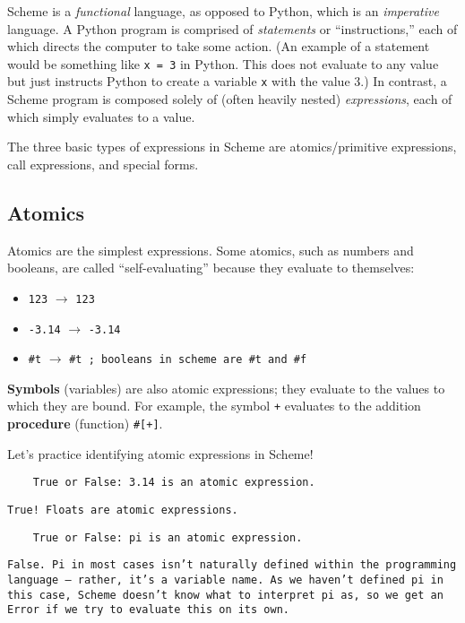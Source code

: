 Scheme is a \textit{functional} language, as opposed to Python, which is an \textit{imperative} language. A Python program is comprised of \textit{statements} or ``instructions,'' each of which directs the computer to take some action. (An example of a statement would be something like \lstinline{x = 3} in Python. This does not evaluate to any value but just instructs Python to create a variable \lstinline{x} with the value 3.) In contrast, a Scheme program is composed solely of (often heavily nested) \textit{expressions}, each of which simply evaluates to a value. 

The three basic types of expressions in Scheme are atomics/primitive expressions, call expressions, and special forms.  

\subsection{Atomics}

Atomics are the simplest expressions. Some atomics, such as numbers and booleans, are called ``self-evaluating'' because they evaluate to themselves: 
\begin{itemize}
    \item \lstinline{123} $\rightarrow$ \lstinline{123}
    \item \lstinline{-3.14} $\rightarrow$ \lstinline{-3.14}
    \item \lstinline{#t} $\rightarrow$ \lstinline{#t ; booleans in scheme are #t and #f}
\end{itemize}

\textbf{Symbols} (variables) are also atomic expressions; they evaluate to the values to which they are bound. For example, the symbol \lstinline{+} evaluates to the addition \textbf{procedure} (function) \lstinline{#[+]}. 

\question Let's practice identifying atomic expressions in Scheme!

\begin{lstlisting}
    True or False: 3.14 is an atomic expression.
\end{lstlisting}
\begin{solution}[0.25in]
\texttt{True! Floats are atomic expressions.}
\end{solution}

\begin{lstlisting}
    True or False: pi is an atomic expression.
\end{lstlisting}
\begin{solution}[0.25in]
    \texttt{False. Pi in most cases isn't naturally defined within the programming language -- rather, it's a variable name. As we haven't defined pi in this case, Scheme doesn't know what to interpret pi as, so we get an Error if we try to evaluate this on its own.}
\end{solution}

